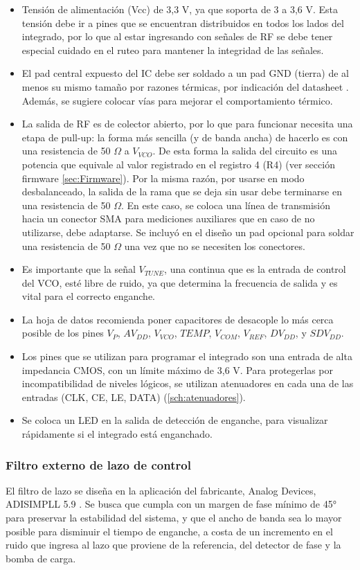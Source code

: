 \begin{itemize}
    \item Tensión de alimentación (Vcc) de 3,3 V, ya que soporta de 3 a 3,6 V. Esta tensión debe ir a pines que se encuentran distribuidos en todos los lados del integrado, por lo que al estar ingresando con señales de RF se debe tener especial cuidado en el ruteo para mantener la integridad de las señales.
    \item El pad central expuesto del IC debe ser soldado a un pad GND (tierra) de al menos su mismo tamaño por razones térmicas, por indicación del datasheet \cite{datasheet_ADF4351}. Además, se sugiere colocar vías para mejorar el comportamiento térmico.
    \item La salida de RF es de colector abierto, por lo que para funcionar necesita una etapa de pull-up: la forma más sencilla (y de banda ancha) de hacerlo es con una resistencia de 50 $\Omega$ a $V_{VCO}$. De esta forma la salida del circuito es una potencia que equivale al valor registrado en el registro 4 (R4) (ver sección firmware \ref{sec:Firmware}). Por la misma razón, por usarse en modo desbalanceado, la salida de la rama que se deja sin usar debe terminarse en una resistencia de 50 $\Omega$. En este caso, se coloca una línea de transmisión hacia un conector SMA para mediciones auxiliares que en caso de no utilizarse, debe adaptarse. Se incluyó en el diseño un pad opcional para soldar una resistencia de 50 $\Omega$ una vez que no se necesiten los conectores.
    \item Es importante que la señal  $V_{TUNE}$, una continua que es la entrada de control del VCO, esté libre de ruido, ya que determina la frecuencia de salida y es vital para el correcto enganche.
    \item La hoja de datos recomienda poner capacitores de desacople lo más cerca posible de los pines $V_{P}$, $AV_{DD}$, $V_{VCO}$, $TEMP$, $V_{COM}$, $V_{REF}$, $DV_{DD}$, y $SDV_{DD}$.
    \item Los pines que se utilizan para programar el integrado son una entrada de alta impedancia CMOS, con un límite máximo de 3,6 V. Para protegerlas por incompatibilidad de niveles lógicos, se utilizan atenuadores en cada una de las entradas (CLK, CE, LE, DATA) (\ref{sch:atenuadores}).
    \item Se coloca un LED en la salida de detección de enganche, para visualizar rápidamente si el integrado está enganchado.  
\end{itemize}

\subsubsection{Filtro externo de lazo de control}
El filtro de lazo se diseña en la aplicación del fabricante, Analog Devices, ADISIMPLL 5.9 \cite{software_ADIsimPLL}. Se busca que cumpla con un margen de fase mínimo de 45° para preservar la estabilidad del sistema, y que el ancho de banda sea lo mayor posible para disminuir el tiempo de enganche, a costa de un incremento en el ruido que ingresa al lazo que proviene de la referencia, del detector de fase y la bomba de carga.

